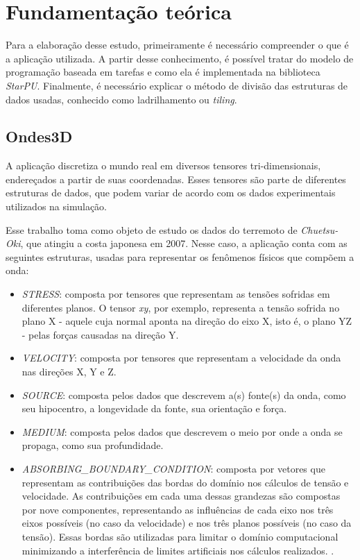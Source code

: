 \documentclass[cic,tc]{iiufrgs}
\begin{document}
\chapter{Fundamentação teórica}
Para a elaboração desse estudo, primeiramente é necessário compreender o que é a aplicação utilizada. A partir desse conhecimento, é possível tratar do modelo de programação
baseada em tarefas e como ela é implementada na biblioteca \textit{StarPU}. Finalmente, é necessário explicar o método de divisão das estruturas de dados usadas, conhecido como
ladrilhamento ou \textit{tiling}.

\section{Ondes3D}
A aplicação discretiza o mundo real em diversos tensores tri-dimensionais, endereçados a partir de suas coordenadas. Esses tensores são parte de diferentes estruturas de dados,
que podem variar de acordo com os dados experimentais utilizados na simulação.

Esse trabalho toma como objeto de estudo os dados do terremoto de \textit{Chuetsu-Oki},
que atingiu a costa japonesa em 2007. Nesse caso, a aplicação conta com as seguintes estruturas, usadas para representar os fenômenos físicos que compõem a onda:

\begin{itemize}
\item{\textit{STRESS}:} composta por tensores que representam as tensões sofridas em diferentes planos. O tensor \textit{xy}, por exemplo, representa a tensão sofrida no plano
  X - aquele cuja normal aponta na direção do eixo X, isto é, o plano YZ - pelas forças causadas na direção Y.
\item{\textit{VELOCITY}:} composta por tensores que representam a velocidade da onda nas direções X, Y e Z.
\item{\textit{SOURCE}:} composta pelos dados que descrevem a(s) fonte(s) da onda, como seu hipocentro, a longevidade da fonte, sua orientação e força.
\item{\textit{MEDIUM}:} composta pelos dados que descrevem o meio por onde a onda se propaga, como sua profundidade.
\item{\textit{ABSORBING\_BOUNDARY\_CONDITION}:} composta por vetores que representam as contribuições das bordas do domínio nos cálculos
  de tensão e velocidade. As contribuições em cada uma dessas grandezas são compostas por nove componentes, representando as influências de
  cada eixo nos três eixos possíveis (no caso da velocidade) e nos três planos possíveis (no caso da tensão). Essas bordas são utilizadas
  para limitar o domínio computacional minimizando a interferência de limites artificiais nos cálculos realizados. \cite{ABCarticle}. 
\end{itemize}
\end{document}
